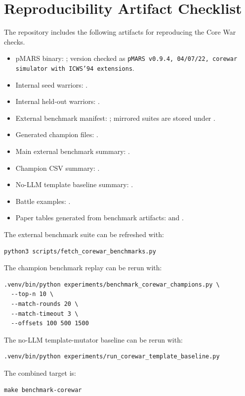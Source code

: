 \documentclass[11pt]{article}
\begin{document}


\section{Reproducibility Artifact Checklist}
\label{app:artifacts}

The repository includes the following artifacts for reproducing the Core War checks.

\begin{itemize}
\item pMARS binary: ; version checked as \texttt{pMARS v0.9.4, 04/07/22, corewar simulator with ICWS'94 extensions}.
\item Internal seed warriors: .
\item Internal held-out warriors: .
\item External benchmark manifest: ; mirrored suites are stored under .
\item Generated champion files: .
\item Main external benchmark summary: .
\item Champion CSV summary: .
\item No-LLM template baseline summary: .
\item Battle examples: .
\item Paper tables generated from benchmark artifacts:  and .
\end{itemize}

The external benchmark suite can be refreshed with:
\begin{verbatim}
python3 scripts/fetch_corewar_benchmarks.py
\end{verbatim}

The champion benchmark replay can be rerun with:
\begin{verbatim}
.venv/bin/python experiments/benchmark_corewar_champions.py \
  --top-n 10 \
  --match-rounds 20 \
  --match-timeout 3 \
  --offsets 100 500 1500
\end{verbatim}

The no-LLM template-mutator baseline can be rerun with:
\begin{verbatim}
.venv/bin/python experiments/run_corewar_template_baseline.py
\end{verbatim}

The combined target is:
\begin{verbatim}
make benchmark-corewar
\end{verbatim}



\end{document}
